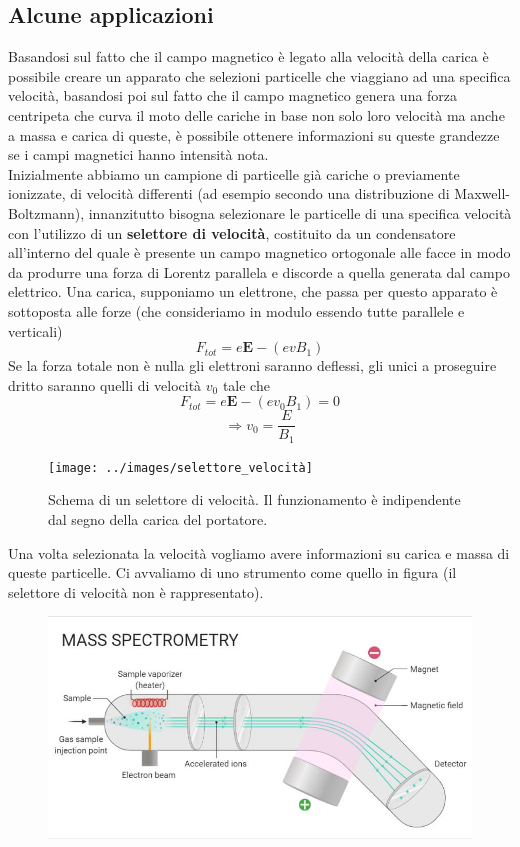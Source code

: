 \documentclass[
10pt, %
a4paper, %
oneside, %
headinclude,footinclude, %
BCOR5mm, %
]{scrartcl}
\begin{document}
\subsection{Alcune applicazioni}
\begin{applicazione}
Basandosi sul fatto che il campo magnetico è legato alla velocità della carica è possibile creare un apparato che selezioni particelle che viaggiano ad una specifica velocità, basandosi poi sul fatto che il campo magnetico genera una forza centripeta che curva il moto delle cariche in base non solo loro velocità ma anche a massa e carica di queste, è possibile ottenere informazioni su queste grandezze se i campi magnetici hanno intensità nota.\\
Inizialmente abbiamo un campione di particelle già cariche o previamente ionizzate, di velocità differenti (ad esempio secondo una distribuzione di Maxwell-Boltzmann), innanzitutto bisogna selezionare le particelle di una specifica velocità con l'utilizzo di un \textbf{selettore di velocità}, costituito da un condensatore all'interno del quale è presente un campo magnetico ortogonale alle facce in modo da produrre una forza di Lorentz  parallela e discorde a quella generata dal campo elettrico. Una carica, supponiamo un elettrone, che passa per questo apparato è sottoposta alle forze (che consideriamo in modulo essendo tutte parallele e verticali)
\[F_{tot} = e\mathbf{E}-(evB_1)\]
Se la forza totale non è nulla gli elettroni saranno deflessi, gli unici a proseguire dritto saranno quelli di velocità \(v_0\) tale che
\[F_{tot}= e\mathbf{E}-(ev_0B_1)=0\]
\[\Rightarrow v_0=\frac{E}{B_1}\]
\begin{figure}[h!]
	\centering
	\texttt{[image: ../images/selettore\_velocità]}
	\caption{Schema di un selettore di velocità. Il funzionamento è indipendente dal segno della carica del portatore.}
	\label{fig:selettorevelocita}
\end{figure}
\FloatBarrier
Una volta selezionata la velocità vogliamo avere informazioni su carica e massa di queste particelle. Ci avvaliamo di uno strumento come quello in figura (il selettore di velocità non è rappresentato).
\begin{figure}[h!]
	\centering
	\includegraphics[width=0.7\linewidth]{../images/spettrometro}

\end{figure}
\end{applicazione}
\end{document}
